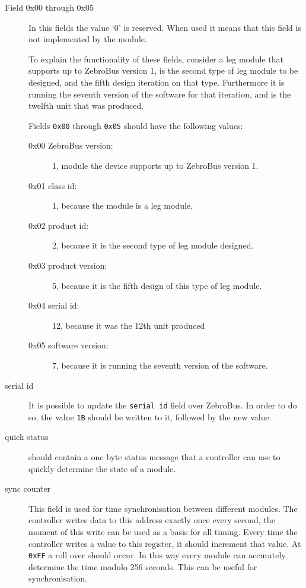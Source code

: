 \begin{description}

\item[Field 0x00 through 0x05]
    In this fields the value `0' is reserved.
    When used it means that this field is not implemented by the module.
    
    To explain the functionality of these fields, consider a leg module that supports up to ZebroBus version 1,
    is the second type of leg module to be designed, and the fifth design iteration on that type.
    Furthermore it is running the seventh version of the software for that iteration, and is the twelfth unit that was produced.
    
    Fields \verb|0x00| through \verb|0x05| should have the following values:
    \begin{description}
        \item[0x00 ZebroBus version:] 1, module the device supports up to ZebroBus version 1.
        \item[0x01 class id:] 1, because the module is a leg module.
        \item[0x02 product id:] 2, because it is the second type of leg module designed.
        \item[0x03 product version:] 5, because it is the fifth design of this type of leg module.
        \item[0x04 serial id:] 12, because it was the 12th unit produced
        \item[0x05 software version:] 7, because it is running the seventh version of the software.
    \end{description}
    
\item[serial id]
    It is possible to update the \verb|serial id| field over ZebroBus.
    In order to do so, the value \verb|1B| should be written to it, followed by the new value.
    
\item[quick status]
    should contain a one byte status message that a controller can use to quickly determine the state of
    a module.
    
\item[sync counter]
    This field is used for time synchronisation between different modules.
    The controller writes data to this address exactly once every second, the moment of this write can be used
    as a basis for all timing.
    Every time the controller writes a value to this register, it should increment that value. At \verb|0xFF| a roll over should occur.
    In this way every module can accurately determine the time modulo 256 seconds.
    This can be useful for synchronisation.
    

\end{description}
